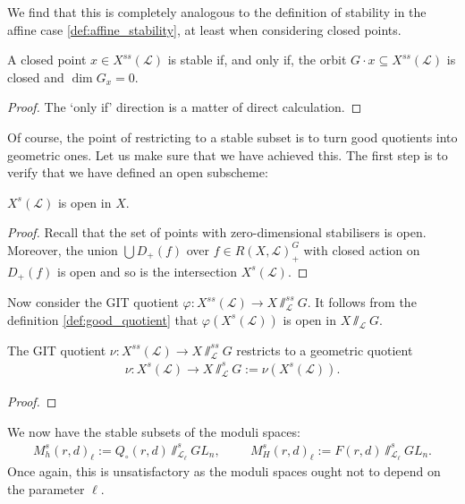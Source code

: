 \documentclass[12pt]{ociamthesis}  %
\begin{document}
We find that this is completely analogous to the definition
of stability in the affine case \ref{def:affine_stability}, at
least when considering closed points.

\begin{lemma}
  A closed point $x\in X^{ss}(\mathscr L)$ is stable if, and only if, the orbit
  $G\cdot x\subseteq X^{ss}(\mathscr L)$ is closed and $\dim G_x = 0$.
  \begin{proof}
    The `only if' direction is a matter of direct calculation.
    \missingproof
  \end{proof}
\end{lemma}

Of course, the point of restricting to a stable subset is to turn
good quotients into geometric ones. Let us make sure that we have
achieved this. The first step is to verify that we have defined
an open subscheme:

\begin{lemma}
  $X^s(\mathscr L)$ is open in $X$.
  \begin{proof}
    Recall that the set of points with zero-dimensional stabilisers is open.
    Moreover, the union $\bigcup D_+(f)$ over $f\in R(X,\mathscr L)_+^G$
    with closed action on $D_+(f)$ is open and so is the intersection
    $X^s(\mathscr L)$.
  \end{proof}
\end{lemma}

Now consider the GIT quotient $\varphi : X^{ss}(\mathscr L)\to X\sslash^{ss}_{\mathscr L} G$.
It follows from the definition \ref{def:good_quotient} that
$\varphi(X^s(\mathscr L))$ is open in $X\sslash_{\mathscr L} G$.

\begin{theorem}
  The GIT quotient $\nu : X^{ss}({\mathscr L}) \to X\sslash^{ss}_{\mathscr L} G$
  restricts to a geometric quotient
  \begin{align*}
    \nu : X^s({\mathscr L}) \to X\sslash^s_{\mathscr L} G := \nu(X^s({\mathscr L})).
  \end{align*}
  \begin{proof}
    \missingproof
  \end{proof}
\end{theorem}

\begin{example}
  We now have the stable subsets of the moduli spaces:
  \begin{align*}
    M^{s}_h(r,d)_\ell := Q_\circ(r,d)\sslash^s_{\mathscr L_\ell} GL_n, \hspace{1cm}
    M^{s}_H(r,d)_\ell := F(r,d)\sslash^s_{\mathscr L_\ell} GL_n.
  \end{align*}
  Once again, this is unsatisfactory as the moduli spaces ought
  not to depend on the parameter $\ell$.
\end{example}
\end{document}

